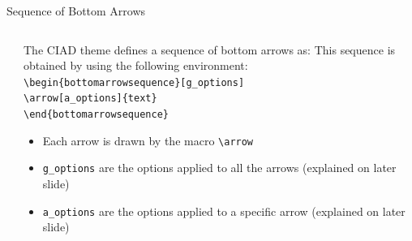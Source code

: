 \documentclass[english,sectioncirclenumberstyle]{ciadbeamer}
\begin{document}
\begin{frame}[t]{Sequence of Bottom Arrows}
	\begin{columns}
		\begin{column}{.2\linewidth}
			\begin{bottomarrowsequence}
			\end{bottomarrowsequence} \\[.5cm]
		\end{column}
		\begin{column}{.8\linewidth}
			The CIAD theme defines a sequence of bottom arrows as:
			\vspace{.5cm}
			This sequence is obtained by using the following environment: \\
			\texttt{{\textbackslash}begin\{bottomarrowsequence\}[g\_options]} \\
			\hspace{.5cm}\texttt{{\textbackslash}arrow[a\_options]\{text\}} \\
			\texttt{{\textbackslash}end\{bottomarrowsequence\}}
			
			\begin{itemize}
			\item Each arrow is drawn by the macro \texttt{{\textbackslash}arrow}
			\item \texttt{g\_options} are the options applied to all the arrows (explained on later slide)
			\item \texttt{a\_options} are the options applied to a specific arrow (explained on later slide)
			\end{itemize}
		\end{column}
	\end{columns}
\end{frame}
\end{document}
